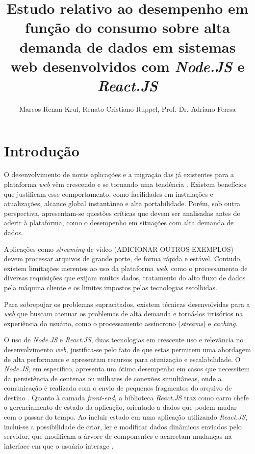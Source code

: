 \documentclass[12pt]{article}
\title{Estudo relativo ao desempenho em função do consumo sobre alta demanda de dados em sistemas web desenvolvidos com \textit{Node.JS} e \textit{React.JS}}
\author{Marcos Renan Krul\inst{1}, Renato Cristiano Ruppel\inst{1}, Prof. Dr. Adriano Ferrsa\inst{1}}
\begin{document}
 

\maketitle


\begin{resumo} 
\end{resumo}


\begin{abstract} 
\end{abstract}


\section{Introdução}

O desenvolvimento de novas aplicações e a migração das já existentes para a plataforma \textit{web} 
vêm crescendo e se tornando uma tendência \cite{SOUZAB}. Existem benefícios que justificam esse comportamento,
como facilidades em instalações e atualizações, alcance global instantâneo e alta portabilidade. Porém,
sob outra perspectiva, apresentam-se questões críticas que devem ser analisadas antes de aderir à plataforma, como
o desempenho em situações com alta demanda de dados.

Aplicações como \textit{streaming} de vídeo (ADICIONAR OUTROS EXEMPLOS) devem processar arquivos de 
grande porte, de forma rápida e estável. Contudo, existem limitações inerentes ao uso da 
plataforma \textit{web}, como o processamento de diversas requisições que exijam muitos dados, 
tratamento do alto fluxo de dados pela máquina cliente e os limites impostos pelas tecnologias escolhidas.

Para sobrepujar os problemas supracitados, existem técnicas desenvolvidas para a \textit{web} que buscam
atenuar os problemas de alta demanda e torná-los irrisórios na experiência do usuário, como o processamento
assíncrono (\textit{streams}) e \textit{caching}.

O uso de \textit{Node.JS} e \textit{React.JS}, duas tecnologias em crescente uso e relevância no
desenvolvimento \textit{web}, justifica-se pelo fato de que estas permitem uma abordagem de alta
performance e apresentam recursos para otimização e escalabilidade. O \textit{Node.JS}, em específico, apresenta
um ótimo desempenho em casos que necessitem da persistência de centenas ou milhares de conexões
simultâneas, onde a comunicação é realizada com o envio de pequenos fragmentos do arquivo de destino
\cite[p. 112]{EJSMONT}. Quanto à camada \textit{front-end}, a biblioteca \textit{React.JS} traz como
carro chefe o gerenciamento de estado da aplicação, orientado a dados que podem mudar com o passar do tempo.
Ao incluir estado em uma aplicação utilizando \textit{React.JS}, inclui-se a possibilidade de criar, ler
e modificar dados dinâmicos enviados pelo servidor, que modificam a árvore de componentes e acarretam 
mudanças na interface em que o usuário interage \cite[p. 97]{BANKSEPORCELLO}.
\end{document}
